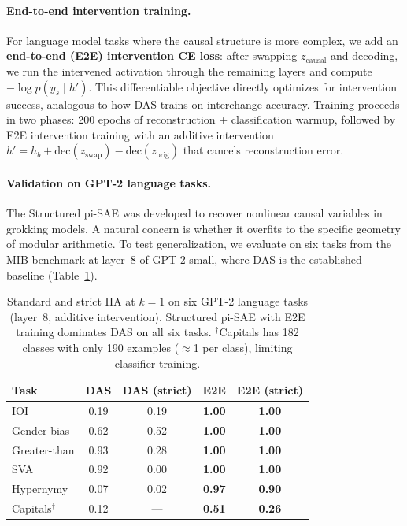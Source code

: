\documentclass{article}
\begin{document}
\paragraph{End-to-end intervention training.}
For language model tasks where the causal structure is more complex, we add an
\textbf{end-to-end (E2E) intervention CE loss}: after swapping $z_\text{causal}$
and decoding, we run the intervened activation through the remaining layers and
compute $-\log p(y_s \mid h')$. This differentiable objective directly
optimizes for intervention success, analogous to how DAS trains on interchange
accuracy. Training proceeds in two phases: 200 epochs of reconstruction +
classification warmup, followed by E2E intervention training with an additive
intervention $h' = h_b + \text{dec}(z_\text{swap}) - \text{dec}(z_\text{orig})$
that cancels reconstruction error.

\paragraph{Validation on GPT-2 language tasks.}
The Structured pi-SAE was developed to recover nonlinear causal variables in
grokking models. A natural concern is whether it overfits to the specific
geometry of modular arithmetic. To test generalization, we evaluate on six
tasks from the MIB benchmark \citep{prakash2024mib} at layer~8 of GPT-2-small,
where DAS is the established baseline (Table~\ref{tab:nlp_results}).

\begin{table}[t]
\centering
\small
\setlength{\tabcolsep}{4pt}
\begin{tabular}{lcccc}
\toprule
\textbf{Task} & \textbf{DAS} & \textbf{DAS (strict)} & \textbf{E2E} & \textbf{E2E (strict)} \\
\midrule
IOI            & 0.19 & 0.19 & \textbf{1.00} & \textbf{1.00} \\
Gender bias    & 0.62 & 0.52 & \textbf{1.00} & \textbf{1.00} \\
Greater-than   & 0.93 & 0.28 & \textbf{1.00} & \textbf{1.00} \\
SVA            & 0.92 & 0.00 & \textbf{1.00} & \textbf{1.00} \\
Hypernymy      & 0.07 & 0.02 & \textbf{0.97} & \textbf{0.90} \\
Capitals$^\dagger$ & 0.12 & ---  & \textbf{0.51} & \textbf{0.26} \\
\bottomrule
\end{tabular}
\caption{Standard and strict IIA at $k{=}1$ on six GPT-2 language tasks
(layer~8, additive intervention). Structured pi-SAE with E2E training
dominates DAS on all six tasks. $^\dagger$Capitals has 182 classes with
only 190 examples ($\approx$1 per class), limiting classifier training.}
\label{tab:nlp_results}
\end{table}
\end{document}
